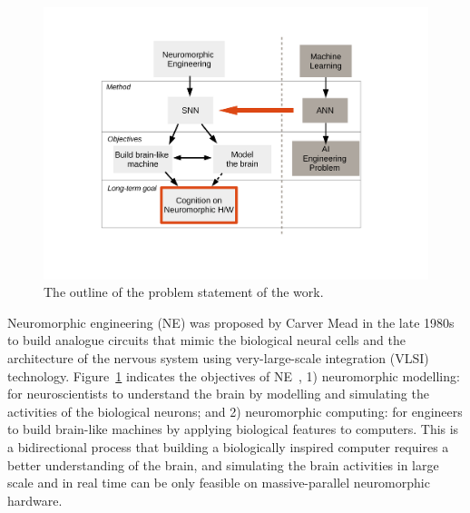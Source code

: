 \begin{figure}[tbh!]
	\centering
	\includegraphics[width=1.0\textwidth]{pics_intro/intro2.pdf}
	\caption{
		The outline of the problem statement of the work.
		}
	\label{fig:intro}
\end{figure}
Neuromorphic engineering (NE) was proposed by Carver Mead in the late 1980s \cite{Mead:1989:AVN:64998} to build analogue circuits that mimic the biological neural cells and the architecture of the nervous system using very-large-scale integration (VLSI) technology.
Figure~\ref{fig:intro} indicates the objectives of NE~\cite{furber2007neural}, 1) neuromorphic modelling: for neuroscientists to understand the brain by modelling and simulating the activities of the biological neurons; and 2) neuromorphic computing: for engineers to build brain-like machines by applying biological features to computers.
This is a bidirectional process that building a biologically inspired computer requires a better understanding of the brain, and simulating the brain activities in large scale and in real time can be only feasible on massive-parallel neuromorphic hardware.

